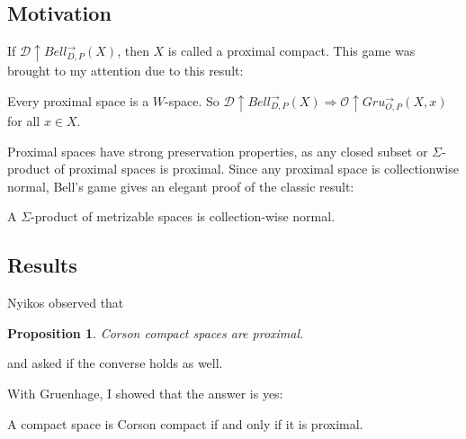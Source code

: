 \documentclass{beamer}
\newtheorem{proposition}[theorem]{Proposition}
\theoremstyle{definition}
\newcommand{\win}{\uparrow}
\newcommand{\gruConGame}[2]{Gru_{O,P}^{\to}\left({#1},{#2}\right)}
\newcommand{\bellAbsConGame}[1]{Bell_{D,P}^{\to}\left({#1}\right)}
\newcommand{\<}{\langle}
\renewcommand{\>}{\rangle}
\newcommand{\pl}[1]{\mathscr{#1}}
\begin{document}
\subsection{Motivation}

\begin{frame}
  If $\pl D\win \bellAbsConGame{X}$, then $X$ is called a proximal compact.
  This game was brought to my attention due to this result: \cite{MR3239205}

  \begin{theorem}
    Every proximal space is a $W$-space. So
    $\pl D\win\bellAbsConGame{X} \Rightarrow \pl O\win\gruConGame{X}{x}$
    for all $x\in X$.
  \end{theorem}

  \vpause

  Proximal spaces have strong preservation properties, as any
  closed subset or $\Sigma$-product of proximal spaces is proximal. Since
  any proximal space is collectionwise normal, Bell's game gives an elegant
  proof of the classic result:

  \begin{theorem}
    A $\Sigma$-product of metrizable spaces is collection-wise normal.
  \end{theorem}
\end{frame}

\subsection{Results}

\begin{frame}
  Nyikos \cite{nyikosProximalPreprint} observed that
  \begin{proposition}
    Corson compact spaces are proximal.
  \end{proposition}
  and asked if the converse holds as well.

  \vpause

  With Gruenhage, I showed that the answer is yes:
  \begin{theorem}
    A compact space is Corson compact if and only if it is proximal.
  \end{theorem}
\end{frame}
\end{document}
